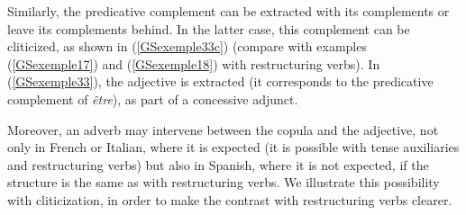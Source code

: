 \documentclass[output=paper]{langsci/langscibook}
\begin{document}
{\begin{exe}
\begin{xlist}
		\label{GSexemple32c} 
	\end{xlist}
\end{exe}

Similarly, the predicative complement can be extracted with its complements or leave its complements behind. In the latter case, this complement can be cliticized, as shown in (\ref{GSexemple33c}) (compare with examples (\ref{GSexemple17}) and (\ref{GSexemple18}) with restructuring verbs). In (\ref{GSexemple33}), the adjective is extracted (it corresponds to the predicative complement of \textit{\^etre}), as part of a concessive adjunct.


\begin{exe}
	\label{GSexemple33} 
	\begin{xlist}
        \label{GSexemple33a} 
		
        \label{GSexemple33b} 
		
		\label{GSexemple33c} 
	\end{xlist}
\end{exe}

Moreover, an adverb may intervene between the copula and the adjective, not only in French or Italian, where it is expected (it is possible with tense auxiliaries and restructuring verbs) but also in Spanish, where it is not expected, if the structure is the same as with restructuring verbs. We illustrate this possibility with cliticization, in order to make the contrast with restructuring verbs clearer.

}
\end{document}
